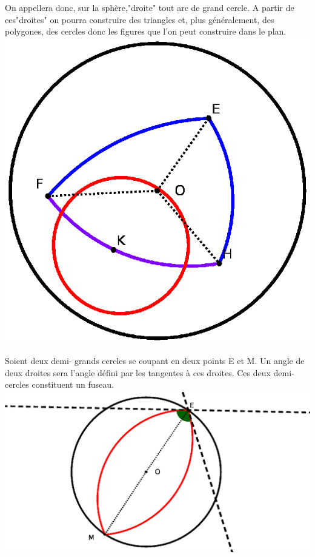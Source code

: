 \documentclass[a4paper, 12pt, twoside]{book}
\begin{document}
     On appellera donc, sur la sphère,"droite" tout arc de grand cercle. A partir de ces"droites" on pourra construire des triangles et, plus généralement, des polygones, des cercles donc les figures que l'on peut construire dans le plan. \\
   
   \includegraphics[scale=0.6]{figures/sphre2.eps} 
        
         Soient deux demi- grands cercles se coupant en deux points E et M. Un angle de deux droites sera l'angle défini par les tangentes à ces droites. Ces deux demi-cercles constituent un fuseau.\\

  
           
    
         
    
     
     \includegraphics[scale=0.6]{figures/sphre1.eps} \\
     
\end{document}
